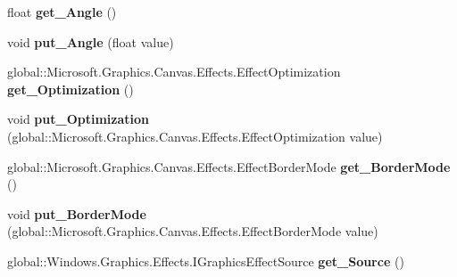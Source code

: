 \begin{DoxyCompactItemize}
float {\bfseries get\+\_\+\+Angle} ()
\item 
\mbox{\label{class_microsoft_1_1_graphics_1_1_canvas_1_1_effects_1_1_directional_blur_effect_a271e08d62a710392a1eb0425cf803992}} 
void {\bfseries put\+\_\+\+Angle} (float value)
\item 
\mbox{\label{class_microsoft_1_1_graphics_1_1_canvas_1_1_effects_1_1_directional_blur_effect_a34a41131fdf14b40d3d67a9a36936eb3}} 
global\+::\+Microsoft.\+Graphics.\+Canvas.\+Effects.\+Effect\+Optimization {\bfseries get\+\_\+\+Optimization} ()
\item 
\mbox{\label{class_microsoft_1_1_graphics_1_1_canvas_1_1_effects_1_1_directional_blur_effect_a497e67c7243081593b64fe7d0947243a}} 
void {\bfseries put\+\_\+\+Optimization} (global\+::\+Microsoft.\+Graphics.\+Canvas.\+Effects.\+Effect\+Optimization value)
\item 
\mbox{\label{class_microsoft_1_1_graphics_1_1_canvas_1_1_effects_1_1_directional_blur_effect_a8e1e8704473064ff603694cb02c0c78f}} 
global\+::\+Microsoft.\+Graphics.\+Canvas.\+Effects.\+Effect\+Border\+Mode {\bfseries get\+\_\+\+Border\+Mode} ()
\item 
\mbox{\label{class_microsoft_1_1_graphics_1_1_canvas_1_1_effects_1_1_directional_blur_effect_acdd57b5d08067ae3121bdbefa68e50b8}} 
void {\bfseries put\+\_\+\+Border\+Mode} (global\+::\+Microsoft.\+Graphics.\+Canvas.\+Effects.\+Effect\+Border\+Mode value)
\item 
\mbox{\label{class_microsoft_1_1_graphics_1_1_canvas_1_1_effects_1_1_directional_blur_effect_aef24cab3895c1c8498616466fcb52a51}} 
global\+::\+Windows.\+Graphics.\+Effects.\+I\+Graphics\+Effect\+Source {\bfseries get\+\_\+\+Source} ()
\item 
\mbox{\label{class_microsoft_1_1_graphics_1_1_canvas_1_1_effects_1_1_directional_blur_effect_aa034111bc667082df708438e58b6ae46}} 

\end{DoxyCompactItemize}

